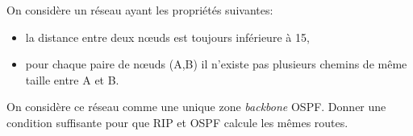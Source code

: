 \documentclass[a4paper,11pt]{article}
\begin{document}
\begin{exo}
On considère un réseau ayant les propriétés suivantes:
\begin{itemize}
    \item la distance entre deux nœuds est toujours inférieure à 15,
    \item pour chaque paire de nœuds (A,B) il n'existe pas plusieurs chemins de même taille entre A et B.
\end{itemize}
On considère ce réseau comme une unique zone \emph{backbone} OSPF. Donner une condition suffisante pour que RIP et OSPF calcule les mêmes routes.
\end{exo}
\end{document}
